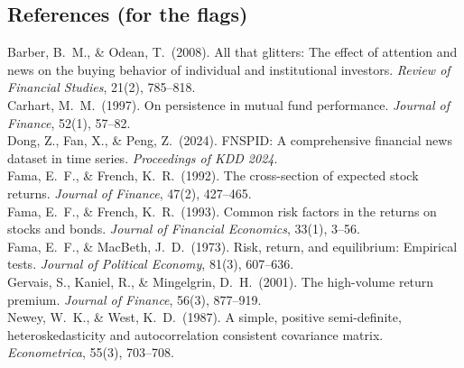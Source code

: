 \documentclass[11pt]{article}
\begin{document}
\subsection*{References (for the flags)}
\small
Barber, B.\ M., \& Odean, T.\ (2008). All that glitters: The effect of attention and news on the buying behavior of individual and institutional investors. \emph{Review of Financial Studies}, 21(2), 785--818.\\
Carhart, M.\ M.\ (1997). On persistence in mutual fund performance. \emph{Journal of Finance}, 52(1), 57--82.\\
Dong, Z., Fan, X., \& Peng, Z.\ (2024). FNSPID: A comprehensive financial news dataset in time series. \emph{Proceedings of KDD 2024}.\\
Fama, E.\ F., \& French, K.\ R.\ (1992). The cross-section of expected stock returns. \emph{Journal of Finance}, 47(2), 427--465.\\
Fama, E.\ F., \& French, K.\ R.\ (1993). Common risk factors in the returns on stocks and bonds. \emph{Journal of Financial Economics}, 33(1), 3--56.\\
Fama, E.\ F., \& MacBeth, J.\ D.\ (1973). Risk, return, and equilibrium: Empirical tests. \emph{Journal of Political Economy}, 81(3), 607--636.\\
Gervais, S., Kaniel, R., \& Mingelgrin, D.\ H.\ (2001). The high-volume return premium. \emph{Journal of Finance}, 56(3), 877--919.\\
Newey, W.\ K., \& West, K.\ D.\ (1987). A simple, positive semi-definite, heteroskedasticity and autocorrelation consistent covariance matrix. \emph{Econometrica}, 55(3), 703--708.
\end{document}
